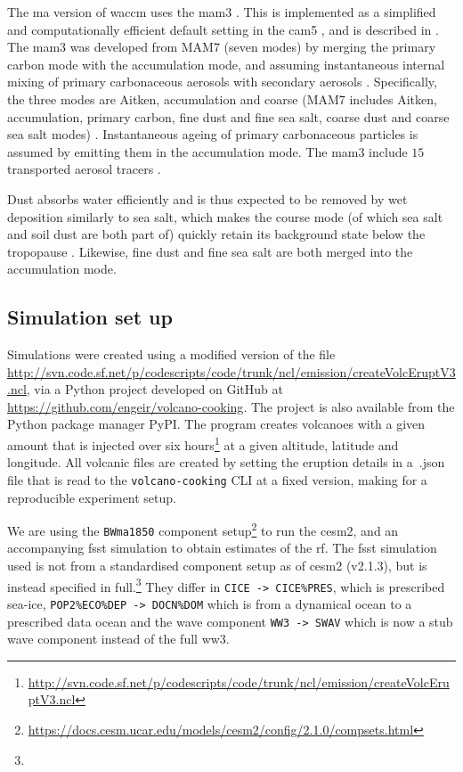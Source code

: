 \documentclass{ametsocV6.1}
\begin{document}
The \gls{ma} version of \gls{waccm} uses the \gls{mam3} \citep{gettleman2019}. This is
implemented as a simplified and computationally efficient default setting in the
\gls{cam5} \citep{liu2016}, and is described in \citet{liu2012}. The \gls{mam3} was
developed from MAM7 (seven modes) by merging the primary carbon mode with the
accumulation mode, and assuming instantaneous internal mixing of primary carbonaceous
aerosols with secondary aerosols \citep{liu2016}. Specifically, the three modes are
Aitken, accumulation and coarse (MAM7 includes Aitken, accumulation, primary carbon,
fine dust and fine sea salt, coarse dust and coarse sea salt modes) \citep{liu2016}.
Instantaneous ageing of primary carbonaceous particles is assumed by emitting them in
the accumulation mode. The \gls{mam3} include \(15\) transported aerosol tracers
\citep{liu2016}.

Dust absorbs water efficiently and is thus expected to be removed by wet deposition
similarly to sea salt, which makes the course mode (of which sea salt and soil dust are
both part of) quickly retain its background state below the tropopause \citep{liu2012}.
Likewise, fine dust and fine sea salt are both merged into the accumulation mode.

\subsection{Simulation set up}

Simulations were created using a modified version of the file
\url{http://svn.code.sf.net/p/codescripts/code/trunk/ncl/emission/createVolcEruptV3.ncl},
via a Python project developed on GitHub at
\url{https://github.com/engeir/volcano-cooking}. The project is also available from the
Python package manager PyPI\@. The program creates volcanoes with a given 
amount that is injected over six
hours\footnote{\url{http://svn.code.sf.net/p/codescripts/code/trunk/ncl/emission/createVolcEruptV3.ncl}}
at a given altitude, latitude and longitude. All volcanic  files are created by
setting the eruption details in a~.json file that is read to the
\texttt{volcano-cooking} CLI at a fixed version, making for a reproducible experiment
setup.

We are using the \texttt{BWma1850} component
setup\footnote{\url{https://docs.cesm.ucar.edu/models/cesm2/config/2.1.0/compsets.html}}
to run the \gls{cesm2}, and an accompanying \gls{fsst}
simulation to obtain estimates of the \gls{rf}. The \gls{fsst} simulation used is not
from a standardised component setup as of \gls{cesm2} (v2.1.3), but is instead specified
in full.\footnote{\fssturl} They differ in \texttt{CICE -> CICE\%PRES}, which is
prescribed sea-ice, \texttt{POP2\%ECO\%DEP -> DOCN\%DOM} which is from a dynamical ocean
to a prescribed data ocean and the wave component \texttt{WW3 -> SWAV} which is now a
stub wave component instead of the full \gls{ww3}.
\end{document}
